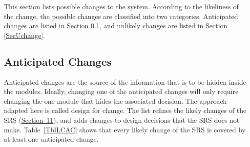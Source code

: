 \documentclass[12pt, titlepage]{article}
\newcommand{\srsurl}{https://team-hindsight.github.io/ophthamology-game/SRS/SRS.pdf}
\newcommand{\srsitemref}[2]{\href{\srsurl\#nameddest=#1}{#2}}
\begin{document}
This section lists possible changes to the system. According to the likeliness
of the change, the possible changes are classified into two
categories. Anticipated changes are listed in Section \ref{SecAchange}, and
unlikely changes are listed in Section \ref{SecUchange}.

\subsection{Anticipated Changes} \label{SecAchange}

Anticipated changes are the source of the information that is to be hidden
inside the modules. Ideally, changing one of the anticipated changes will only
require changing the one module that hides the associated decision. The approach
adapted here is called design for change. The list refines the likely changes
of the SRS (\srsitemref{sec_LikelyChanges}{Section~11}), and adds changes to design decisions that the SRS does
not make. Table~\ref{TblLCAC} shows that every likely change of the SRS is
covered by at least one anticipated change.
\end{document}
